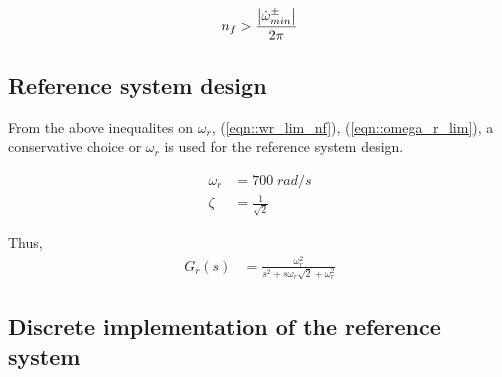\begin{align}
    n_f > \frac{\left\lvert \dot \omega^{\pm}_{min} \right\rvert}{2 \pi}
\end{align}



\subsection{Reference system design}
From the above inequalites on $\omega_r$, (\ref{eqn::wr_lim_nf}),
(\ref{eqn::omega_r_lim}), a conservative choice or $\omega_r$ is used for the
reference system design.

\begin{align}
    \omega_r &= 700 \; rad/s\\
    \zeta &= \frac{1}{\sqrt{2}}
\end{align}

Thus,
\begin{align}
    G_r (s) &= \frac{\omega_r^2}{s^2 + s \omega_r \sqrt{2}  + \omega_r^2}
\end{align}


\subsection{Discrete implementation of the reference system}

